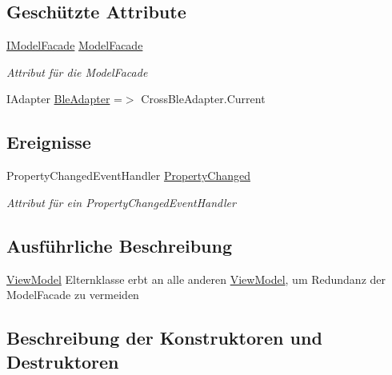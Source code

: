 \subsection*{Geschützte Attribute}
\begin{DoxyCompactItemize}
\item 
\mbox{\hyperlink{interfacemy_m_d_1_1_model_interface_1_1_model_facade_interface_1_1_i_model_facade}{I\+Model\+Facade}} \mbox{\hyperlink{classmy_m_d_1_1_view_model_1_1_overall_view_model_1_1_overall_view_model_ab1b0e7b2ed9ae07614caa1e45b942e3f}{Model\+Facade}}
\begin{DoxyCompactList}\small\item\em Attribut für die Model\+Facade \end{DoxyCompactList}\item 
I\+Adapter \mbox{\hyperlink{classmy_m_d_1_1_view_model_1_1_overall_view_model_1_1_overall_view_model_acff4179c3cbf2cd35046729e99cd6921}{Ble\+Adapter}} =$>$ Cross\+Ble\+Adapter.\+Current
\end{DoxyCompactItemize}
\subsection*{Ereignisse}
\begin{DoxyCompactItemize}
\item 
Property\+Changed\+Event\+Handler \mbox{\hyperlink{classmy_m_d_1_1_view_model_1_1_overall_view_model_1_1_overall_view_model_a1918d3d8d384486e278426327b16256f}{Property\+Changed}}
\begin{DoxyCompactList}\small\item\em Attribut für ein Property\+Changed\+Event\+Handler \end{DoxyCompactList}\end{DoxyCompactItemize}


\subsection{Ausführliche Beschreibung}
\mbox{\hyperlink{namespacemy_m_d_1_1_view_model}{View\+Model}} Elternklasse erbt an alle anderen \mbox{\hyperlink{namespacemy_m_d_1_1_view_model}{View\+Model}}, um Redundanz der Model\+Facade zu vermeiden 



\subsection{Beschreibung der Konstruktoren und Destruktoren}
\mbox{\label{classmy_m_d_1_1_view_model_1_1_overall_view_model_1_1_overall_view_model_a1cc6b22c187773cdc72ee92f21ea5aba}} 
